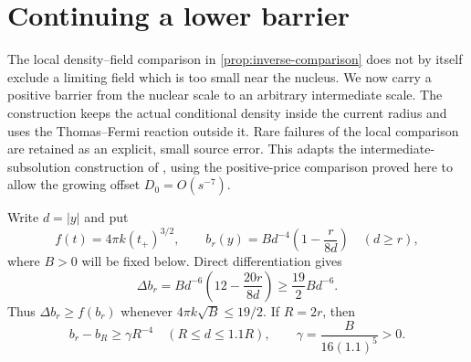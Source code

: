 \section{Continuing a lower barrier}\label{sec:barriers}

The local density--field comparison in \cref{prop:inverse-comparison} does not by itself
exclude a limiting field which is too small near the nucleus.  We now
carry a positive barrier from the nuclear scale to an arbitrary
intermediate scale.  The construction keeps the actual conditional
density inside the current radius and uses the Thomas--Fermi reaction
outside it.  Rare failures of the local comparison are retained as an
explicit, small source error.  This adapts the intermediate-subsolution
construction of \cite[\FIntermediate]{Foundation}, using the positive-price
comparison proved here to allow the growing offset $D_0=O(s^{-7})$.

Write $d=|y|$ and put
\begin{equation}\label{eq:barrier-function}
 f(t)=4\pi k(t_+)^{3/2},\qquad
 b_r(y)=B d^{-4}\left(1-\frac r{8d}\right)\quad(d\ge r),
\end{equation}
where $B>0$ will be fixed below.  Direct differentiation gives
\[
 \Delta b_r=Bd^{-6}\left(12-\frac{20r}{8d}\right)
       \ge \frac{19}{2}Bd^{-6}.
\]
Thus $\Delta b_r\ge f(b_r)$ whenever
$4\pi k\sqrt B\le19/2$.  If $R=2r$, then
\begin{equation}\label{eq:barrier-gap}
 b_r-b_R\ge\gamma R^{-4}\quad(R\le d\le1.1R),
 \qquad \gamma=\frac{B}{16(1.1)^5}>0.
\end{equation}


